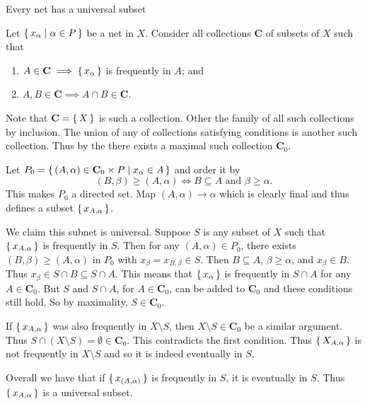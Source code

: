 \documentclass[letterpaper, 11pt, oneside]{book}
\begin{document}
\begin{thrm}\label{thrm: net_has_universal_subnet}
  Every net has a universal subset
\end{thrm}
\begin{pf}
  Let $\set{x_{\alpha} | \alpha \in P}$ be a net in $X$.
  Consider all collections \textbf{C} of subsets of $X$ such that
  \begin{enumerate}
  \item $A \in \textbf{C} \implies \set{x_{\alpha}}$ is frequently in $A$; and
  \item $A, B \in \textbf{C} \implies A \cap B \in \textbf{C}$.
  \end{enumerate}
  Note that $\textbf{C} = \set{X}$ is such a collection.
  Other the family of all such collections by inclusion.
  The union of any  of collections satisfying conditions is another such collection.
  Thus by the  there exists a maximal such collection $\textbf{C}_{0}$.

  Let $P_{0} = \set{(A, \alpha) \in \textbf{C}_{0} \times P | x_{\alpha} \in A}$ and order it by
  \[
    (B, \beta) \geq (A, \alpha) \iff B \subseteq A \text{ and } \beta \geq \alpha.
  \]
  This makes $P_{0}$ a directed set.
  Map $(A, \alpha) \to \alpha$ which is clearly final and thus defines a subset $\set{x_{A, \alpha}}$.

  We claim this subnet is universal.
  Suppose $S$ is any subset of $X$ such that $\set{x_{A, \alpha}}$ is frequently in $S$.
  Then for any $(A, \alpha) \in P_{0}$, there exists $(B, \beta) \geq (A, \alpha)$ in $P_{0}$ with $x_{\beta} = x_{B, \beta} \in S$.
  Then $B \subseteq A$, $\beta \geq \alpha$, and $x_{\beta} \in B$.
  Thus $x_{\beta} \in S \cap B \subseteq S \cap A$.
  This means that $\set{x_\alpha}$ is frequently in $S \cap A$ for any $A \in \textbf{C}_{0}$.
  But $S$ and $S \cap A$, for $A \in \textbf{C}_{0}$, can be added to $\textbf{C}_{0}$ and these conditions still hold.
  So by maximality, $S \in \textbf{C}_{0}$.

  If $\set{x_{A, \alpha}}$ was also frequently in $X \setminus S$, then $X \setminus S \in \textbf{C}_{0}$ be a similar argument.
  Thus $S \cap (X \setminus S) = \emptyset \in \textbf{C}_{0}$.
  This contradicts the first condition.
  Thus $\set{X_{A, \alpha}}$ is not frequently in $X \setminus S$ and so it is indeed eventually in $S$.

  Overall we have that if $\set{x_{(A, \alpha)}}$ is frequently in $S$, it is eventually in $S$.
  Thus $\set{x_{A, \alpha}}$ is a universal subset.
\end{pf}
\end{document}

